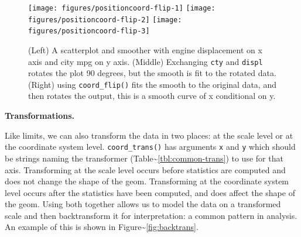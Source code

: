 \begin{Shaded}
\begin{Highlighting}[]
 \StringTok{ }\NormalTok{()}
 \StringTok{ }\NormalTok{()}
 \StringTok{ }\NormalTok{() +}\StringTok{ }\NormalTok{()}
\end{Highlighting}
\end{Shaded}

\begin{figure}
\texttt{[image: figures/positioncoord-flip-1]} \texttt{[image: figures/positioncoord-flip-2]} \texttt{[image: figures/positioncoord-flip-3]} \caption{(Left) A scatterplot and smoother with engine displacement on x axis and city mpg on y axis.  (Middle) Exchanging \texttt{cty} and \texttt{displ} rotates the plot 90 degrees, but the smooth is fit to the rotated data.  (Right) using \texttt{coord\_flip()} fits the smooth to the original data, and then rotates the output, this is a smooth curve of x conditional on y.\label{fig:coord-flip}}
\end{figure}

\textbf{Transformations.}

Like limits, we can also transform the data in two places: at the scale
level or at the coordinate system level. \texttt{coord\_trans()} has
arguments \texttt{x} and \texttt{y} which should be strings naming the
transformer (Table\textasciitilde{}\ref{tbl:common-trans}) to use for
that axis. Transforming at the scale level occurs before statistics are
computed and does not change the shape of the geom. Transforming at the
coordinate system level occurs after the statistics have been computed,
and does affect the shape of the geom. Using both together allows us to
model the data on a transformed scale and then backtransform it for
interpretation: a common pattern in analysis. An example of this is
shown in Figure\textasciitilde{}\ref{fig:backtrans}.
 

\begin{Shaded}
\begin{Highlighting}[]
\StringTok{ }\NormalTok{(}\NormalTok{)}
  \NormalTok{) +}\StringTok{ }
\StringTok{  }\NormalTok{(} \NormalTok{)}
\NormalTok{() +}\StringTok{ }\NormalTok{(}  
\end{Highlighting}
\end{Shaded}

